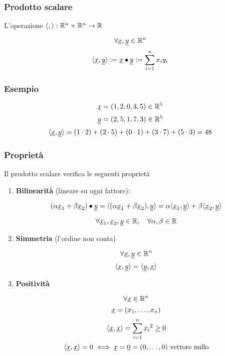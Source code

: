 \pagebreak{}

\subsubsection{Prodotto scalare}

L'operazione \(\langle,\rangle : \mathbb{R}^{n} \times \mathbb{R}^{n} \rightarrow \mathbb{R} \)

\[
    \forall \underline{x} ,\underline{y} \in \mathbb{R}^{n}
\]
\[
    \langle\underline{x},\underline{y}\rangle := \underline{x} \bullet \underline{y} := \sum^{n}_{i=1} x_i y_i
\]

\subsubsection*{Esempio}
\[
    \underline{x}=(1,2,0,3,5) \in \mathbb{R}^{5}
\]
\[
    \underline{y}=(2,5,1,7,3) \in \mathbb{R}^{5}
\]
\[
    \langle\underline{x},\underline{y}\rangle = (1\cdot2)+(2\cdot5)+(0\cdot1)+(3\cdot7)+(5\cdot3) = 48
\]

\subsubsection*{Proprietà}

Il prodotto scalare verifica le seguenti proprietà

\begin{enumerate}
    \item \textbf{Bilinearità} (lineare su ogni fattore):

          \[
              (\alpha \underline{x}_1 + \beta \underline{x}_2) \bullet \underline{y} = \langle(\alpha \underline{x}_1 + \beta \underline{x}_2),\underline{y}\rangle = \alpha \langle\underline{x}_1,\underline{y}\rangle + \beta \langle\underline{x}_2,\underline{y}\rangle
          \]

          \[
              \forall \underline{x}_1,\underline{x}_2,\underline{y} \in \mathbb{R}, \quad \forall \alpha, \beta \in \mathbb{R}
          \]

    \item \textbf{Simmetria} (l'ordine non conta)

          \[
              \forall \underline{x},\underline{y} \in \mathbb{R}^{n}
          \]
          \[
              \langle\underline{x},\underline{y}\rangle = \langle\underline{y},\underline{x}\rangle
          \]

    \item \textbf{Positività}

          \[
              \forall \underline{x} \in  \mathbb{R}^{n}
          \]
          \[
              \underline{x}=(x_1, \ldots ,x_n)
          \]
          \[
              \langle\underline{x},\underline{x}\rangle = \sum^{n}_{i=1} {x_i}^{2}\ge 0
          \]
          \[
              \langle\underline{x},\underline{x}\rangle = 0 \iff \underline{x} = \underline{0} = (0, \ldots ,0)\ \text{vettore nullo}
          \]

\end{enumerate}

